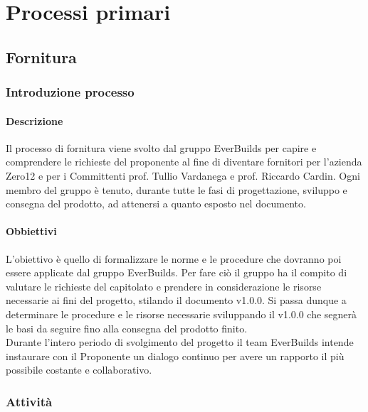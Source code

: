 \section{Processi primari}
    \subsection{Fornitura}
        \subsubsection{Introduzione processo}
            \paragraph{Descrizione}
                Il processo di fornitura viene svolto dal gruppo EverBuilds per capire e comprendere le richieste del proponente al fine di diventare fornitori per l’azienda Zero12 e per i Committenti prof. Tullio Vardanega e prof. Riccardo Cardin. Ogni membro del gruppo è tenuto, durante tutte le fasi di progettazione, sviluppo e consegna del prodotto, ad attenersi a quanto esposto nel documento.\\
            \paragraph{Obbiettivi}
                L’obiettivo è quello di formalizzare le norme e le procedure che dovranno poi essere applicate dal gruppo EverBuilds. Per fare ciò il gruppo ha il compito di valutare le richieste del capitolato e prendere in considerazione le risorse necessarie ai fini del progetto, stilando il documento  v1.0.0. Si passa dunque a determinare le procedure e le risorse necessarie sviluppando il  v1.0.0 che segnerà le basi da seguire fino alla consegna del prodotto finito.\\
                Durante l’intero periodo di svolgimento del progetto il team EverBuilds intende instaurare con il Proponente un dialogo continuo per avere un rapporto il più possibile costante e collaborativo.\\
        \subsubsection{Attività}
